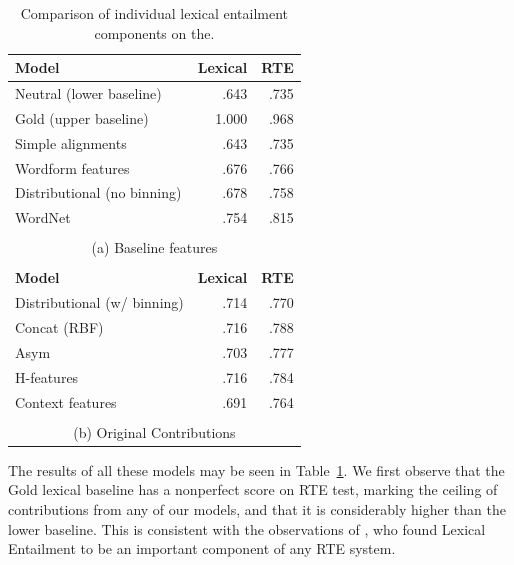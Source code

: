 \begin{table}
  \centering
  \begin{tabular}{|lrr|}
  \hline
  {\bf Model}                & {\bf Lexical} &     {\bf RTE}  \\
  \hline\hline
  Neutral (lower baseline)    &      .643     &        .735   \\
  Gold (upper baseline)       &     1.000     &        .968   \\
  \hline
  Simple alignments           &      .643     &        .735   \\
  Wordform features           &      .676     &        .766   \\
  Distributional (no binning) &      .678     &        .758   \\
  WordNet                     &      .754     &        .815   \\
  \hline
  \multicolumn{3}{c}{}\\
  [-0.5em]
  \multicolumn{3}{c}{(a) Baseline features}\\
  \multicolumn{3}{c}{}\\
  \hline
  {\bf Model}                & {\bf Lexical} &     {\bf RTE} \\
  \hline\hline
  Distributional (w/ binning) &      .714     &        .770   \\
  \hline
  Concat (RBF)                &      .716     &        .788   \\
  Asym                        &      .703     &        .777   \\
  H-features                  &      .716     &        .784   \\
  \hline
  Context features            &      .691     &        .764   \\
  \hline
  \multicolumn{3}{c}{}\\
  [-0.5em]
  \multicolumn{3}{c}{{(b) Original Contributions}}\\
  \end{tabular}
  \caption{Comparison of individual lexical entailment components on the.}
  \label{tab:indivrte}
\end{table}

The results of all these models may be seen in Table~\ref{tab:indivrte}.
We first observe that the Gold lexical baseline has a nonperfect score
on RTE test, marking the ceiling of contributions from any of our models, and
that it is considerably higher than the lower baseline. This is consistent
with the observations of \cite{dagan:2006:mlc}, who found Lexical Entailment
to be an important component of any RTE system.

